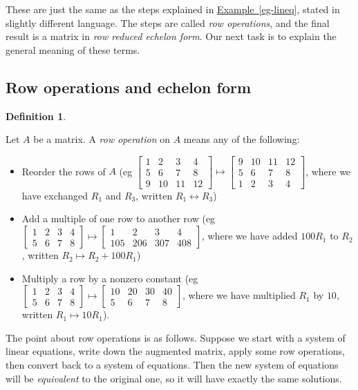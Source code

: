 \documentclass[a4paper]{book}
\newcommand{\RED}[1]{{\color{red}#1}}
\newcommand{\PURPLE}[1]{{\color{purple}#1}}
\newcommand{\bbm}       {\begin{bmatrix}}
\newcommand{\ebm}       {\end{bmatrix}}
\renewcommand{\:}{\colon}
\newcommand{\bilabel}[1]{\hypertarget{#1}{\label{#1}}}
\newcommand{\biref}[2]{\hyperlink{#2}{#1~\ref*{#2}}}
\newcommand{\EMPH}[1]{\RED{\emph{#1}}}
\newcommand{\DEFN}[1]{\PURPLE{\emph{#1}}}
\theoremstyle{definition}
\newtheorem{definition}[theorem]{Definition}
\begin{document}
These are just the same as the steps explained in
\biref{Example}{eg-lineq}, stated in slightly different language.  The
steps are called \DEFN{row operations}, and the final result is a
matrix in \DEFN{row reduced echelon form}.  Our next task is to explain
the general meaning of these terms.

\subsection{Row operations and echelon form}
\label{subsec-rref}

\begin{definition}\bilabel{defn-rowop}
 Let $A$ be a matrix.  A \DEFN{row operation} on $A$ means any of the
 following:
 \begin{itemize}
  \item Reorder the rows of $A$
   (eg {\small $\bbm 1&2&3&4\\ 5&6&7&8 \\ 9&10&11&12\ebm \mapsto
                \bbm 9&10&11&12\\ 5&6&7&8 \\ 1&2&3&4\ebm$},
    where we have exchanged $R_1$ and $R_3$, written
    $R_1\leftrightarrow R_3$)
  \item Add a multiple of one row to another row
   (eg {\small $\bbm 1&2&3&4 \\ 5&6&7&8\ebm \mapsto
                \bbm 1&2&3&4 \\ 105&206&307&408\ebm$},
   where we have added $100R_1$ to $R_2$, written
   $R_2\mapsto R_2+100R_1$) 
  \item Multiply a row by a nonzero constant
   (eg {\small $\bbm 1&2&3&4 \\ 5&6&7&8\ebm \mapsto
                \bbm 10&20&30&40 \\ 5&6&7&8\ebm$},
   where we have multiplied $R_1$ by $10$, written $R_1\mapsto 10R_1$).
 \end{itemize}
\end{definition}
The point about row operations is as follows.  Suppose we start with a
system of linear equations, write down the augmented matrix, apply
some row operations, then convert back to a system of equations.  Then
the new system of equations will be \EMPH{equivalent} to the original
one, so it will have exactly the same solutions.  
\end{document}

